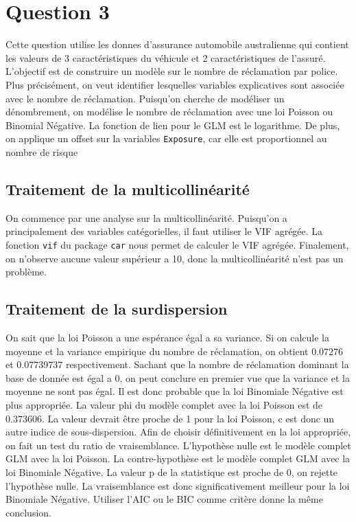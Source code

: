 \documentclass{article}
\begin{document}
\section{Question 3}
	Cette question utilise les donnes d'assurance automobile australienne qui contient les valeurs de 3 caractéristiques du véhicule et 2 caractéristiques de l'assuré. L'objectif est de construire un modèle sur le nombre de réclamation par police. Plus précisément, on veut identifier lesquelles variables explicatives sont associée avec le nombre de réclamation. Puisqu’on cherche de modéliser un dénombrement, on modélise le nombre de réclamation avec une loi Poisson ou Binomial Négative. La fonction de lien pour le GLM est le logarithme. De plus, on applique un offset sur la variables \texttt{Exposure}, car elle est proportionnel au nombre de risque
	
	\subsection{Traitement de la multicollinéarité}
	On commence par une analyse sur la multicollinéarité. Puisqu'on a principalement des variables catégorielles, il faut utiliser le VIF agrégée. La fonction \texttt{vif} du package \texttt{car} nous permet de calculer le VIF agrégée. Finalement, on n'observe aucune valeur supérieur a 10, donc la multicollinéarité n'est pas un problème. 
	
	\subsection{Traitement de la surdispersion}
	
	On sait que la loi Poisson a une espérance égal a sa variance. Si on calcule la moyenne et la variance empirique du nombre de réclamation, on obtient $0.07276$ et $0.07739737$ respectivement. Sachant que la nombre de réclamation dominant la base de donnée est égal a 0, on peut conclure en premier vue que la variance et la moyenne ne sont pas égal. Il est donc probable que la loi Binomiale Négative est plus appropriée. La valeur phi du modèle complet avec la loi Poisson est de $0.373606$. La valeur devrait être proche de 1 pour la loi Poisson, c est donc un autre indice de sous-dispersion. 
	Afin de choisir définitivement en la loi appropriée, on fait un test du ratio de vraisemblance. L'hypothèse nulle est le modèle complet GLM avec la loi Poisson. La contre-hypothèse est le modèle complet GLM avec la loi Binomiale Négative. La valeur p de la statistique est proche de 0, on rejette l'hypothèse nulle. La vraisemblance est donc significativement meilleur pour la loi Binomiale Négative. Utiliser l'AIC ou le BIC comme critère donne la même conclusion. 
	
\end{document}
